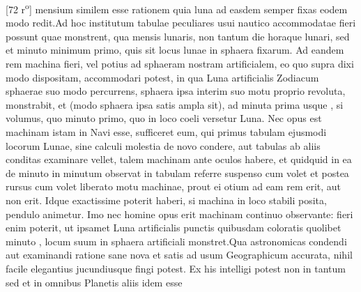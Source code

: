 [72 r\textsuperscript{o}] mensium similem esse rationem quia luna\protect{} ad  easdem semper fixas\protect{} eodem modo redit.\pend \pstart Ad hoc institutum tabulae peculiares usui nautico accommodatae fieri possunt quae monstrent, qua mensis lunaris, non tantum die horaque lunari, sed et minuto minimum primo, quis sit locus lunae\protect{} in sphaera fixarum\protect{}. Ad eandem rem machina fieri, vel potius ad sphaeram nostram artificialem, eo quo supra dixi modo dispositam, accommodari potest, in qua Luna\protect{} artificialis Zodiacum\protect{} sphaerae suo modo  percurrens, sphaera ipsa interim suo motu proprio revoluta, monstrabit, et (modo sphaera ipsa satis ampla sit), ad minuta prima usque , si volumus, quo minuto primo, quo in loco coeli versetur Luna\protect{}. Nec opus est machinam  istam in Navi\protect{} esse, sufficeret eum, qui primus tabulam ejusmodi locorum Lunae\protect{}, sine calculi molestia de novo condere, aut tabulas ab aliis conditas examinare vellet, talem machinam ante oculos habere, et quidquid in ea de minuto in minutum observat in tabulam referre suspenso cum volet et postea rursus cum volet liberato motu machinae, prout ei otium ad eam rem  erit, aut non erit. Idque exactissime poterit haberi, si machina in loco stabili posita, pendulo\protect{} animetur. Imo nec homine opus erit machinam continuo observante: fieri enim poterit, ut ipsamet Luna\protect{} artificialis punctis quibusdam coloratis quolibet minuto , locum suum in sphaera artificiali monstret.\pend \pstart Qua  astronomicas condendi aut  examinandi ratione sane nova et satis ad usum Geographicum accurata, nihil facile  elegantius jucundiusque fingi potest. \pend \pstart Ex his intelligi potest non in \protect{} tantum sed et in omnibus Planetis aliis idem esse